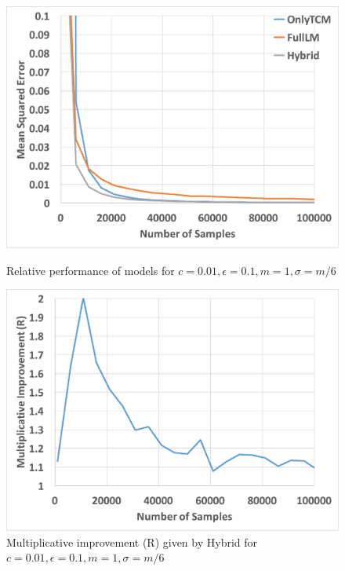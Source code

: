 \documentclass{article}
\theoremstyle{plain}
\begin{document}
\begin{figure}[t]
\begin{minipage}[t]{.49\textwidth}
\includegraphics[width=0.99\linewidth]{eps01c01.pdf}
\caption{Relative performance of models for $c=0.01, \epsilon=0.1, m=1, \sigma = m/6$}
\end{minipage}
\begin{minipage}[t]{.49\textwidth}
\includegraphics[width=0.99\linewidth]{imp_eps01c01.pdf}
\caption{Multiplicative improvement (R) given by Hybrid for $c=0.01, \epsilon=0.1, m=1, \sigma = m/6$}
\end{minipage}
\end{figure}
\end{document}
